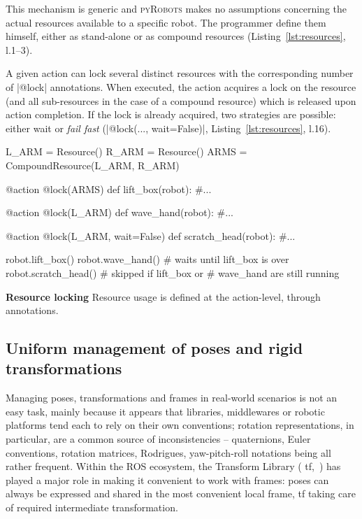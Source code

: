 \documentclass[letterpaper, 10pt, conference]{ieeeconf}      %
\newcommand{\pyRobots}{\textsc{pyRobots}}
\begin{document}
This mechanism is generic and \pyRobots{} makes no assumptions concerning the
actual resources available to a specific robot. The
programmer define them himself, either as stand-alone or as compound
resources (Listing~\ref{lst:resources}, l.1--3).

A given action can lock several distinct resources with the corresponding
number of \python|@lock| annotations. When executed, the
action acquires a lock on the resource (and all sub-resources in the case
of a compound resource) which is released upon action completion. If the lock is
already acquired, two strategies are possible: either wait or \emph{fail fast}
(\python|@lock(..., wait=False)|, Listing~\ref{lst:resources}, l.16).

\begin{listing}
\begin{pythoncode}
    L_ARM = Resource()
    R_ARM = Resource()
    ARMS = CompoundResource(L_ARM, R_ARM)

    @action
    @lock(ARMS)
    def lift_box(robot):
        #...

    @action
    @lock(L_ARM)
    def wave_hand(robot):
        #...

    @action
    @lock(L_ARM, wait=False)
    def scratch_head(robot):
        #...

    robot.lift_box()
    robot.wave_hand() # waits until lift_box is over
    robot.scratch_head() # skipped if lift_box or
                         # wave_hand are still running

\end{pythoncode}
\caption{\textbf{Resource locking} Resource usage is defined at the
action-level, through annotations.}

\label{lst:resources}
\end{listing}



\subsection{Uniform management of poses and rigid transformations}

Managing poses, transformations and frames in real-world scenarios is not an
easy task, mainly because it appears that libraries, middlewares or robotic
platforms tend each to rely on their own conventions; rotation representations,
in particular, are a common source of inconsistencies -- quaternions, Euler
conventions, rotation matrices, Rodrigues, yaw-pitch-roll notations being all
rather frequent. Within the ROS ecosystem, the Transform Library ({\sc
tf},~\cite{foote2013tf}) has played a major role in making it convenient to work
with frames: poses can always be expressed and shared in the most convenient
local frame, {\sc tf} taking care of required intermediate transformation.
\end{document}
